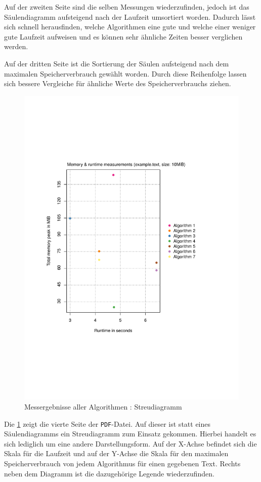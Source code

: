 Auf der zweiten Seite sind die selben Messungen wiederzufinden, jedoch ist das Säulendiagramm aufsteigend nach der Laufzeit umsortiert worden. Dadurch lässt sich schnell herausfinden, welche Algorithmen eine gute und welche einer weniger gute Laufzeit aufweisen und es können sehr ähnliche Zeiten besser verglichen werden.

Auf der dritten Seite ist die Sortierung der Säulen aufsteigend nach dem maximalen Spei\-cher\-ver\-brauch gewählt worden. Durch diese Reihenfolge lassen sich bessere Vergleiche für ähnliche Werte des Spei\-cher\-ver\-brauchs ziehen.

\begin{figure}
	\includegraphics[page = 1, width=.5\textwidth]{kapitel/framework/benchmark/sacabench-batch/beispiel_batch_streu.pdf}
	\caption{Messergebnisse aller Algorithmen : Streudiagramm}
	\label{pdf:benchmark:batch:streu}
\end{figure}

Die \cref{pdf:benchmark:batch:streu} zeigt die vierte Seite der \texttt{PDF}-Datei. Auf dieser ist statt eines Säulendiagramms ein Streudiagramm zum Einsatz gekommen. Hierbei handelt  es sich lediglich um eine andere Darstellungsform. Auf der X-Achse befindet sich die Skala für die Laufzeit und auf der Y-Achse die Skala für den maximalen Spei\-cher\-ver\-brauch von jedem Algorithmus für einen gegebenen Text. Rechts neben dem Diagramm ist die dazugehörige Legende wiederzufinden.

